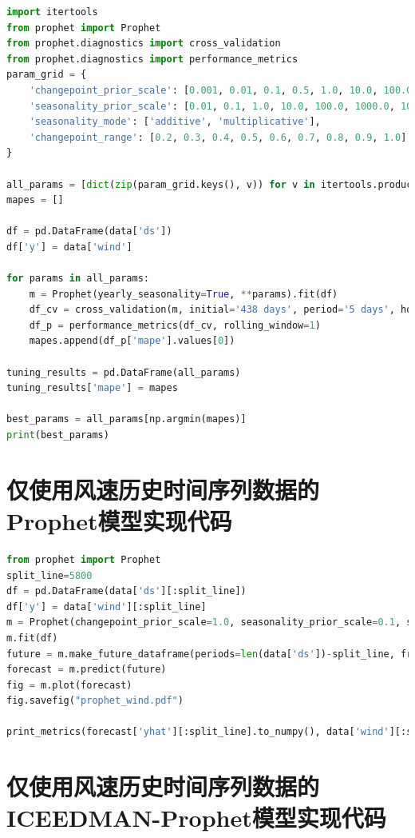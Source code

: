 \documentclass[AutoFakeBold]{LZUThesis}
\begin{document}
\begin{lstlisting}[language = python]
import itertools
from prophet import Prophet
from prophet.diagnostics import cross_validation
from prophet.diagnostics import performance_metrics
param_grid = {  
    'changepoint_prior_scale': [0.001, 0.01, 0.1, 0.5, 1.0, 10.0, 100.0, 1000.0, 10000.0],
    'seasonality_prior_scale': [0.01, 0.1, 1.0, 10.0, 100.0, 1000.0, 10000.0],
    'seasonality_mode': ['additive', 'multiplicative'],
    'changepoint_range': [0.2, 0.3, 0.4, 0.5, 0.6, 0.7, 0.8, 0.9, 1.0]
}

all_params = [dict(zip(param_grid.keys(), v)) for v in itertools.product(*param_grid.values())]
mapes = []

df = pd.DataFrame(data['ds'])
df['y'] = data['wind']

for params in all_params:
    m = Prophet(yearly_seasonality=True, **params).fit(df)
    df_cv = cross_validation(m, initial='438 days', period='5 days', horizon = '5 days', parallel="processes")
    df_p = performance_metrics(df_cv, rolling_window=1)
    mapes.append(df_p['mape'].values[0])

tuning_results = pd.DataFrame(all_params)
tuning_results['mape'] = mapes

best_params = all_params[np.argmin(mapes)]
print(best_params)
\end{lstlisting}

\section{仅使用风速历史时间序列数据的Prophet模型实现代码}

\begin{lstlisting}[language = python]
from prophet import Prophet
split_line=5800
df = pd.DataFrame(data['ds'][:split_line])
df['y'] = data['wind'][:split_line]
m = Prophet(changepoint_prior_scale=1.0, seasonality_prior_scale=0.1, seasonality_mode='additive', changepoint_range=1, yearly_seasonality=True)
m.fit(df)
future = m.make_future_dataframe(periods=len(data['ds'])-split_line, freq='3H')
forecast = m.predict(future)
fig = m.plot(forecast)
fig.savefig("prophet_wind.pdf")

print_metrics(forecast['yhat'][:split_line].to_numpy(), data['wind'][:split_line].to_numpy())
\end{lstlisting}

\section{仅使用风速历史时间序列数据的ICEEDMAN-Prophet模型实现代码}
\end{document}

